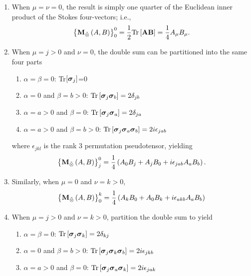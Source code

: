 \documentclass[twocolumn]{aastex6}
\newcommand{\mbf}[1]{\mbox{\boldmath $#1$}}
\newcommand{\irow}{\mu} \newcommand{\icol}{\nu}
\newcommand{\srow}{j} \newcommand{\scol}{k}
\newcommand{\trace}{{\rm Tr}}
\newcommand{\tr}[1]{\trace\ensuremath{ \left[ {#1} \right] }}
\newcommand{\bilinear}[2]{\ensuremath{\left({#1},{#2}\right)}}
\newcommand{\stimes}{\ensuremath{\tilde{\otimes}}}
\newcommand{\spinorMueller}[2]{\ensuremath{{\bf M}_{\stimes}\bilinear{#1}{#2}}}
\newcommand{\pauli}[1]{\ensuremath{\mbf{\sigma}_{#1}}}
\begin{document}
{\begin{appendix}
\begin{enumerate}
\item When $\irow=\icol=0$,
  the result is simply one quarter of the Euclidean inner product of
  the Stokes four-vectors; i.e.,
%
\begin{equation}
\label{eqn:M00}
\left\{\spinorMueller{A}{B}\right\}_0^0 = \frac{1}{2} \tr{\bf AB}
     = \frac{1}{4} A_\irow B_\irow.
\end{equation}
%
\item When $\irow=\srow>0$ and $\icol=0$,
the double sum can be partitioned into the same four parts
%
\begin{enumerate}
\item $\alpha=\beta=0$: \tr{\pauli{\srow}}=0
\item $\alpha=0$ and $\beta=b>0$: $\tr{\pauli{\srow}\pauli{b}}=2\delta_{\srow b}$
\item $\alpha=a>0$ and $\beta=0$: $\tr{\pauli{\srow}\pauli{a}}=2\delta_{\srow a}$
\item $\alpha=a>0$ and $\beta=b>0$: $\tr{\pauli{\srow}\pauli{a}\pauli{b}}=2i\epsilon_{\srow ab}$ %
\end{enumerate}
where $\epsilon_{jkl}$ is the rank 3 permutation pseudotensor, yielding
\begin{equation}
\label{eqn:Mj0}
\left\{\spinorMueller{A}{B}\right\}_\srow^0 
     = \frac{1}{4} \left( A_0 B_\srow + A_\srow B_0 + i \epsilon_{\srow ab} A_a B_b \right).
\end{equation}
%
\item Similarly, when $\irow=0$ and $\icol=\scol>0$,
\begin{equation}
\label{eqn:M0k}
\left\{\spinorMueller{A}{B}\right\}_0^\scol 
     = \frac{1}{4} \left( A_\scol B_0 + A_0 B_\scol + i \epsilon_{a\scol b} A_a B_b \right)
\end{equation}
%
\item When $\irow=\srow>0$ and $\icol=\scol>0$, partition the double sum to yield
%
\begin{enumerate}
\item $\alpha=\beta=0$: $\tr{\pauli{\srow}\pauli{\scol}}=2\delta_{\scol\srow}$
\item $\alpha=0$ and $\beta=b>0$: $\tr{\pauli{\srow}\pauli{\scol}\pauli{b}}=2i\epsilon_{\srow\scol b}$ %
\item $\alpha=a>0$ and $\beta=0$: $\tr{\pauli{\srow}\pauli{a}\pauli{\scol}}=2i\epsilon_{\srow a\scol}$ %

\end{enumerate}
\end{enumerate}
\end{appendix}}
\end{document}
